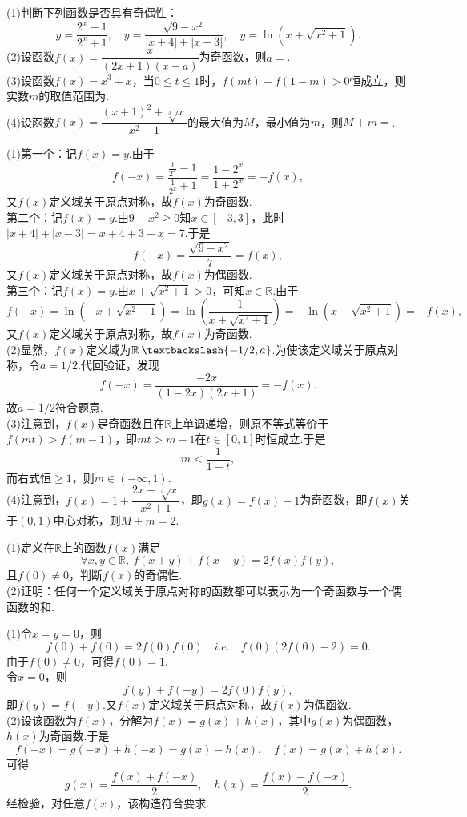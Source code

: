 \documentclass[lang=cn, zihao=5]{elegantbook}
\newcommand{\ssb}[1]{\left( #1 \right)}
\newcommand{\R}{\mathbb{R}}
\newcommand{\tk}{\uline{\hspace{4em}}}
\DeclareMathOperator{\setjianfa}{\textbackslash}
\begin{document}
\begin{example}
	(1)判断下列函数是否具有奇偶性：$$y = \frac{2^x-1}{2^x+1},\quad y=\frac{\sqrt{9-x^2}}{|x+4|+|x-3|},\quad y=\ln \ssb{x + \sqrt{x^2+1}}.$$
	(2)设函数$f(x)=\dfrac{x}{(2x+1)(x-a)}$为奇函数，则$a=$\tk . \\
	(3)设函数$f(x)=x^3+x$，当$0 \leq t \leq 1$时，$f(mt)+f(1-m)>0$恒成立，则实数$m$的取值范围为\tk . \\
	(4)设函数$f(x)=\dfrac{(x+1)^2+\sqrt[3]{x}}{x^2+1}$的最大值为$M$，最小值为$m$，则$M+m=$\tk .
\end{example}
\begin{solution}
	(1)第一个：记$f(x)=y$.由于$$f(-x) = \frac{\frac{1}{2^x} -1}{\frac{1}{2^x} +1} = \frac{1-2^x}{1+2^x} = -f(x),$$
	又$f(x)$定义域关于原点对称，故$f(x)$为奇函数. \\
	第二个：记$f(x)=y$.由$9-x^2 \geq 0$知$x \in [-3,3]$，此时$|x+4|+|x-3|=x+4+3-x=7$.于是$$f(-x)=\frac{\sqrt{9-x^2}}{7}=f(x),$$
	又$f(x)$定义域关于原点对称，故$f(x)$为偶函数. \\
	第三个：记$f(x)=y$.由$x + \sqrt{x^2+1} > 0$，可知$x \in \R$.由于$$f(-x) = \ln \ssb{-x+\sqrt{x^2+1}} = \ln \ssb{\frac{1}{x+\sqrt{x^2+1}}} = -\ln \ssb{x + \sqrt{x^2+1}} = -f(x),$$
	又$f(x)$定义域关于原点对称，故$f(x)$为奇函数. \\
	(2)显然，$f(x)$定义域为$\R \setjianfa \{-1/2,a \}$.为使该定义域关于原点对称，令$a=1/2$.代回验证，发现$$f(-x) = \frac{-2x}{(1-2x)(2x+1)} = -f(x).$$
	故$a=1/2$符合题意. \\
	(3)注意到，$f(x)$是奇函数且在$\R$上单调递增，则原不等式等价于$f(mt)>f(m-1)$，即$mt>m-1$在$t \in [0,1]$时恒成立.于是$$m < \frac{1}{1-t},$$
	而右式恒$\geq 1$，则$m \in (-\infty ,1)$. \\
	(4)注意到，$f(x)=1+\dfrac{2x+\sqrt[3]{x}}{x^2+1}$，即$g(x)=f(x)-1$为奇函数，即$f(x)$关于$(0,1)$中心对称，则$M+m=2$.
\end{solution}

\begin{example}
	(1)定义在$\R$上的函数$f(x)$满足$$\forall x,y \in \R ,~f(x+y)+f(x-y)=2f(x)f(y),$$且$f(0) \neq 0$，判断$f(x)$的奇偶性. \\
	(2)证明：任何一个定义域关于原点对称的函数都可以表示为一个奇函数与一个偶函数的和.
\end{example}
\begin{solution}
	(1)令$x=y=0$，则$$f(0)+f(0)=2f(0)f(0) \quad i.e. \quad f(0)\ssb{2f(0)-2}=0.$$
	由于$f(0) \neq 0$，可得$f(0)=1$. \\
	令$x=0$，则$$f(y)+f(-y)=2f(0)f(y),$$
	即$f(y)=f(-y)$.又$f(x)$定义域关于原点对称，故$f(x)$为偶函数. \\
	(2)设该函数为$f(x)$，分解为$f(x)=g(x)+h(x)$，其中$g(x)$为偶函数，$h(x)$为奇函数.于是$$f(-x)=g(-x)+h(-x)=g(x)-h(x),\quad f(x)=g(x)+h(x).$$
	可得$$g(x)=\frac{f(x)+f(-x)}{2},\quad h(x)=\frac{f(x)-f(-x)}{2}.$$
	经检验，对任意$f(x)$，该构造符合要求.
\end{solution}
\end{document}
